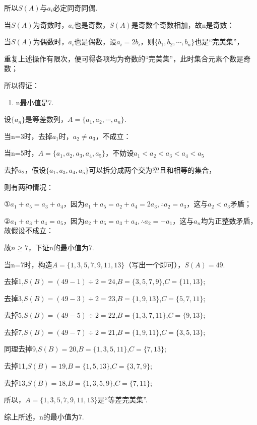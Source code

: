 \documentclass[11pt,a4paper]{ctexart}
\begin{document}
所以\(S(A)\)与\(a_{i}\)必定同奇同偶.

当\(S(A)\)为奇数时，\(a_{i}\)也是奇数，\(S(A)\)是奇数个奇数相加，故n是奇数：

当\(S(A)\)为偶数时，\(a_{i}\)也是偶数，设\(a_{i}=2b_{i}\)，则\(\{b_{1},b_{2},\cdots,b_{n}\}\)也是``完美集''，

重复上述操作有限次，便可得各项均为奇数的``完美集''，此时集合元素个数是奇数；

所以得证：

\begin{enumerate}[label=\arabic*., leftmargin=*, start=3]
\item n最小值是7.
\end{enumerate}

设\(\{a_{n}\}\)是等差数列，\(A=\{a_{1},a_{2},\cdots,a_{n}\}\).

当n=3时，去掉\(a_{1}\)时，\(a_{2}\neq a_{3}\)，不成立：

当n=5时，\(A=\{a_{1},a_{2},a_{3},a_{4},a_{5}\}\)，不妨设\(a_{1}<a_{2}<a_{3}<a_{4}<a_{5}\)

去掉\(a_{2}\)，假设\(\{a_1,a_3,a_4,a_5\}\)可以拆分成两个交为空且和相等的集合，

则有两种情况：

①\(a_{1}+a_{5}=a_{3}+a_{4}\)，因为\(a_{1}+a_{5}=a_{2}+a_{4}=2a_{3},\therefore a_{2}=a_{3}\)，这与\(a_{2}<a_{3}\)矛盾；

②\(a_{1}+a_{3}+a_{4}=a_{5}\)，因为\(a_{2}+a_{5}=a_{3}+a_{4},\therefore a_{2}=-a_{1}\)，这与\(a_{n}\)均为正整数矛盾，故假设不成立：

故\(n \geq 7\)，下证n的最小值为7.

当n=7时，构造\(A=\{1,3,5,7,9,11,13\}\)（写出一个即可），\(S(A)=49\).

去掉1,\(S(B)=(49-1)\div2=24\),\(B=\{3,5,7,9\}\),\(C=\{11,13\}\);

去掉3,\(S(B)=(49-3)\div2=23\),\(B=\{1,9,13\}\),\(C=\{5,7,11\}\);

去掉5,\(S(B)=(49-5)\div2=22\),\(B=\{1,3,7,11\}\),\(C=\{9,13\}\);

去掉7,\(S(B)=(49-7)\div2=21\),\(B=\{1,9,11\}\),\(C=\{3,5,13\}\);

同理去掉9,\(S(B)=20\),\(B=\{1,3,5,11\}\),\(C=\{7,13\}\);

去掉11,\(S(B)=19\),\(B=\{1,5,13\}\),\(C=\{3,7,9\}\);

去掉13,\(S(B)=18\),\(B=\{1,3,5,9\}\),\(C=\{7,11\}\);

所以，\(A=\{1,3,5,7,9,11,13\}\)是``等差完美集''.

综上所述，n的最小值为7.
\end{document}
